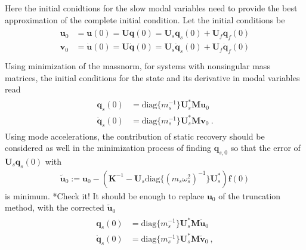 \documentclass[letterpaper,10pt,english]{jupyterBook}
\begin{document}
\sphinxAtStartPar
{} Here the initial conidtions for the slow modal variables need to provide the best approximation of the complete initial condition. Let the initial conditions be
\begin{equation*}
\begin{split}\begin{aligned}
  \mathbf{u}_0 & =      \mathbf{u} (0) = \mathbf{U}      \mathbf{q} (0) = \mathbf{U}_s      \mathbf{q}_s (0) + \mathbf{U}_f      \mathbf{q}_f (0) \\
  \mathbf{v}_0 & = \dot{\mathbf{u}}(0) = \mathbf{U} \dot{\mathbf{q}}(0) = \mathbf{U}_s \dot{\mathbf{q}}_s(0) + \mathbf{U}_f \dot{\mathbf{q}}_f(0) \\
\end{aligned}\end{split}
\end{equation*}
\sphinxAtStartPar
{} Using minimization of the mass\sphinxhyphen{}norm, for systems with non\sphinxhyphen{}singular mass matrices, the initial conditions for the state and its derivative in modal variables read
\begin{equation*}
\begin{split}\begin{aligned}
       \mathbf{q}_s (0) & = \text{diag}\{ m_s^{-1} \} \mathbf{U}_s^* \mathbf{M} \mathbf{u}_0 \\
  \dot{\mathbf{q}}_s(0) & = \text{diag}\{ m_s^{-1} \} \mathbf{U}_s^* \mathbf{M} \mathbf{v}_0 \ .
\end{aligned}\end{split}
\end{equation*}
\sphinxAtStartPar
{} Using mode accelerations, the contribution of static recovery should be considered as well in the minimization process of finding \(\mathbf{q}_{s,0}\) so that the error of \(\mathbf{U}_s \mathbf{q}_s(0)\) with
\begin{equation*}
\begin{split}\widetilde{\mathbf{u}}_0 := \mathbf{u}_0 - \left( \mathbf{K}^{-1} - \mathbf{U}_s \text{diag}\{ (m_s \omega_s^2)^{-1} \} \mathbf{U}^*_s  \right) \mathbf{f}(0)\end{split}
\end{equation*}
\sphinxAtStartPar
is minimum.  *Check it! It should be enough to replace \(\mathbf{u}_0\) of the truncation method, with the corrected \(\widetilde{\mathbf{u}}_0\)
\begin{equation*}
\begin{split}\begin{aligned}
       \mathbf{q}_s (0) & = \text{diag}\{ m_s^{-1} \} \mathbf{U}_s^* \mathbf{M} \widetilde{\mathbf{u}}_0 \\
  \dot{\mathbf{q}}_s(0) & = \text{diag}\{ m_s^{-1} \} \mathbf{U}_s^* \mathbf{M} \widetilde{\mathbf{v}}_0 \ ,
\end{aligned}\end{split}
\end{equation*}
\end{document}
